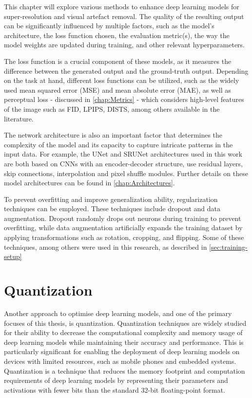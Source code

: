 \label{chap:Optimizations}

This chapter will explore various methods to enhance deep learning models for super-resolution and visual artefact removal. The quality of the resulting output can be significantly influenced by multiple factors, such as the model's architecture, the loss function chosen, the evaluation metric(s), the way the model weights are updated during training, and other relevant hyperparameters.

The loss function is a crucial component of these models, as it measures the difference between the generated output and the ground-truth output. Depending on the task at hand, different loss functions can be utilized, such as the widely used mean squared error (MSE) and mean absolute error (MAE), as well as perceptual loss - discussed in \cref{chap:Metrics} - which considers high-level features of the image such as FID, LPIPS, DISTS, among others available in the literature.

The network architecture is also an important factor that determines the complexity of the model and its capacity to capture intricate patterns in the input data. For example, the UNet and SRUNet architectures used in this work are both based on CNNs with an encoder-decoder structure, use residual layers, skip connections, interpolation and pixel shuffle modules. Further details on these model architectures can be found in \cref{chap:Architectures}.

To prevent overfitting and improve generalization ability, regularization techniques can be employed. These techniques include dropout and data augmentation. Dropout randomly drops out neurons during training to prevent overfitting, while data augmentation artificially expands the training dataset by applying transformations such as rotation, cropping, and flipping. Some of these techniques, among others were used in this research, as described in \cref{sec:training-setup}

\section{Quantization}
\label{sec:quantization}

Another approach to optimise deep learning models, and one of the primary focuses of this thesis, is quantization. Quantization techniques are widely studied for their ability to decrease the computational complexity and memory usage of deep learning models while maintaining their accuracy and performance. This is particularly significant for enabling the deployment of deep learning models on devices with limited resources, such as mobile phones and embedded systems. Quantization is a technique that reduces the memory footprint and computation requirements of deep learning models by representing their parameters and activations with fewer bits than the standard 32-bit floating-point format.

